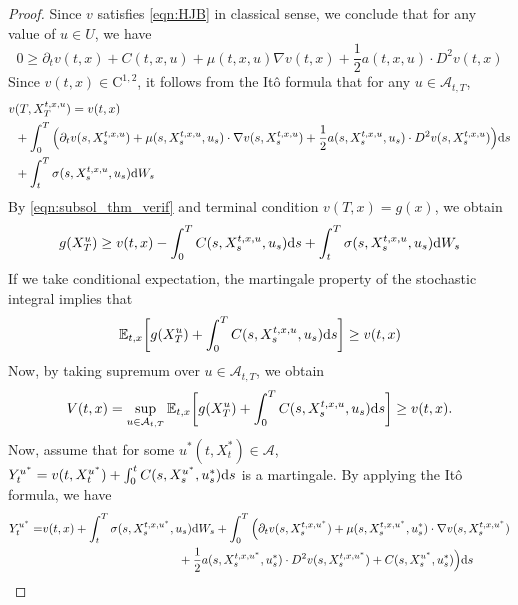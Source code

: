 \documentclass[11pt]{book}
\newcommand{\ds}{\text{\normalfont d}s}
\newcommand{\dW}{\text{\normalfont d}W}
\begin{document}
\begin{proof}
Since $v$ satisfies \eqref{eqn:HJB} in classical sense, we conclude that for any value of $u\in U$, we have 
\begin{equation}\label{eqn:subsol_thm_verif}
0\ge\partial_{t}v(t,x)+C(t,x,u)+\mu(t,x,u)\nabla v(t,x)+\frac12{a(t,x,u)}\cdot D^2v(t,x) 
\end{equation}
Since $v(t,x)\in\mathrm{C}^{1,2}$, it follows from the It\^o formula that for any $u\in\mathcal{A}_{t,T}$, 
\begin{equation}
\begin{split}
v&(T,X_T^{t,x,u})=v(t,x)\\
&+\int_0^T\Big(\partial_{t}v(s,X_s^{t,x,u})+\mu(s,X_s^{t,x,u},u_s)\cdot\nabla v(s,X_s^{t,x,u})+\frac12{a(s,X_s^{t,x,u},u_s)}\cdot D^2v(s,X_s^{t,x,u})\Big){{\ds}}\\
&+\int_t^T\sigma(s,X_s^{t,x,u},u_s)\dW_s
\end{split}
\end{equation}
By \eqref{eqn:subsol_thm_verif} and terminal condition $v(T,x)=g(x)$, we obtain
\begin{equation}\label{eqn:911}
g(X_T^u)\ge{v}(t,x)-\int_0^TC(s,X_s^{t,x,u},u_s){{\ds}}+\int_t^T\sigma(s,X_s^{t,x,u},u_s)\dW_s
\end{equation}
If we take conditional expectation, the martingale property of the stochastic integral implies that
\begin{equation}
\mathbb{E}_{t,x}\bigg[g(X_T^u)+\int_0^TC(s,X_s^{t,x,u},u_s){{\ds}}\bigg]\ge{v}(t,x)
\end{equation}
Now, by taking supremum over $u\in\mathcal{A}_{t,T}$, we obtain
\begin{equation}
V(t,x)=\sup_{u\in\mathcal{A}_{t,T}}\mathbb{E}_{t,x}\bigg[g(X_T^u)+\int_0^TC(s,X_s^{t,x,u},u_s){{\ds}}\bigg]\ge{v}(t,x).
\end{equation}\label{eqn:913}
Now, assume that  for some $u^*(t,X^*_t)\in\mathcal{A}$, $Y^{u^*}_t=v(t,X_t^{u^*})+\int_0^t C(s,X_s^{u^*},u^*_s) {{\ds}}$ is a martingale. By applying the It\^o formula, we have
\begin{equation}
\begin{split}
Y^{u^*}_t=&v(t,x)+\int_t^T\sigma(s,X_s^{t,x,u^*},u_s)\dW_s+\int_0^T\Big(\partial_{t}v(s,X_s^{t,x,u^*})+\mu(s,X_s^{t,x,u^*},u^*_s)\cdot \nabla v(s,X_s^{t,x,u^*})\\
&\hspace*{4cm}+\frac12{a(s,X_s^{t,x,u^*},u^*_s)}\cdot D^2v(s,X_s^{t,x,u^*})+C(s,X_s^{u^*},u^*_s)\Big){{\ds}}\\

\end{split}
\end{equation}
\end{proof}
\end{document}
